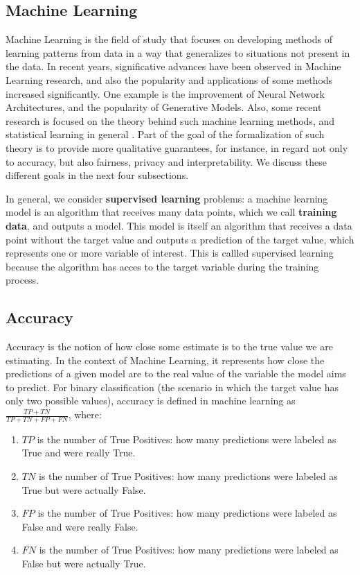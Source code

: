 \subsection{Machine Learning}

Machine Learning is the field of study that focuses on developing methods of learning patterns from data in a way that generalizes to situations not present in the data. In recent years, significative advances have been observed in Machine Learning research, and also the popularity and applications of some methods increased significantly. One example is the improvement of Neural Network Architectures\cite{?}, and the popularity of Generative Models\cite{?}. Also, some recent research is focused on the theory behind such machine learning methods\cite{livros de SAAMAP}, and statistical learning in general \cite{VladmirNaumovichVapnik}. Part of the goal of the formalization of such theory is to provide more qualitative guarantees, for instance, in regard not only to accuracy, but also fairness, privacy and interpretability. We discuss these different goals in the next four subsections.

In general, we consider \textbf{supervised learning} problems: a machine learning model is an algorithm that receives many data points, which we call \textbf{training data}, and outputs a model. This model is itself an algorithm that receives a data point without the target value and outputs a prediction of the target value, which represents one or more variable of interest. This is callled supervised learning because the algorithm has acces to the target variable during the training process.

\subsection{Accuracy}

Accuracy is the notion of how close some estimate is to the true value we are estimating. In the context of Machine Learning, it represents how close the predictions of a given model are to the real value of the variable the model aims to predict. For binary classification (the scenario in which the target value has only two possible values), accuracy is defined in machine learning as $\frac{TP+TN}{TP+TN+FP+FN}$, where:

\begin{enumerate}
\item $TP$ is the number of True Positives: how many predictions were labeled as True and were really True.
\item $TN$ is the number of True Positives: how many predictions were labeled as True but were actually False.
\item $FP$ is the number of True Positives: how many predictions were labeled as False and were really False.
\item $FN$ is the number of True Positives: how many predictions were labeled as False but were actually True.
\end{enumerate}

